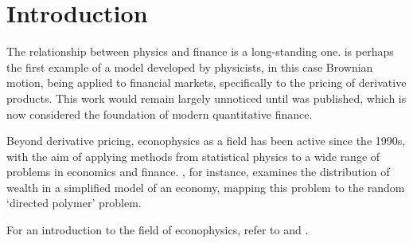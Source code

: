 \chapter{Introduction}\label{ch:introduction}
The relationship between physics and finance is a long-standing one. \cite{bachelier} is perhaps the first example of a model developed by physicists, in this case Brownian motion, being applied to financial markets, specifically to the pricing of derivative products. This work would remain largely unnoticed until \cite{black_scholes} was published, which is now considered the foundation of modern quantitative finance.

Beyond derivative pricing, econophysics as a field has been active since the 1990s, with the aim of applying methods from statistical physics to a wide range of problems in economics and finance. \cite{bouchaud_mezard_2000}, for instance, examines the distribution of wealth in a simplified model of an economy, mapping this problem to the random `directed polymer' problem.

For an introduction to the field of econophysics, refer to  \cite{Mantegna_Stanley_1999} and \cite{econophysics_2011_review}.


